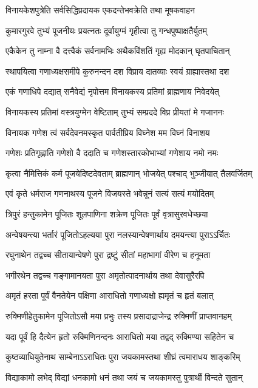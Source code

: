\begin{center}
\twolineshloka
{विनायकेशपुत्रेति सर्वसिद्धिप्रदायक}
{एकदन्तेभवक्रेति तथा मूषकवाहन}%

\twolineshloka
{कुमारगुरवे तुभ्यं पूजनीयः प्रयत्नतः}
{दूर्वायुग्मं गृहीत्वा तु गन्धपुष्पाक्षतैर्युतम्}%

\twolineshloka
{एकैकेन तु नाम्ना वै दत्त्वैकं सर्वनामभिः}
{अथैकविंशतिं गृह्य मोदकान् घृतपाचितान्}%

\twolineshloka
{स्थापयित्वा गणाध्यक्षसमीपे कुरुनन्दन}
{दश विप्राय दातव्याः स्वयं ग्राह्यास्तथा दश}%

\twolineshloka
{एकं गणाधिपे दद्यात् सनैवेद्यं नृपोत्तम}
{विनायकस्य प्रतिमां ब्राह्मणाय निवेदयेत्}%

\twolineshloka
{विनायकस्य प्रतिमां वस्त्रयुग्मेन वेष्टिताम्}
{तुभ्यं सम्प्रददे विप्र प्रीयतां मे गजाननः}%

\twolineshloka
{विनायक गणेश त्वं सर्वदेवनमस्कृत}
{पार्वतीप्रिय विघ्नेश मम विघ्नं विनाशय}%

\twolineshloka
{गणेशः प्रतिगृह्णाति गणेशो वै ददाति च}
{गणेशस्तारकोभाभ्यां गणेशाय नमो नमः}%

\twolineshloka
{कृत्वा नैमित्तिकं कर्म पूजयेदिष्टदेवताम्}
{ब्राह्मणान् भोजयेत् पश्चाद् भुञ्जीयात् तैलवर्जितम्}%

\twolineshloka
{एवं कृते धर्मराज गणनाथस्य पूजने}
{विजयस्ते भवेन्नूनं सत्यं सत्यं मयोदितम्}%

\twolineshloka
{त्रिपुरं हन्तुकामेन पूजितः शूलपाणिना}
{शक्रेण पूजितः पूर्वं वृत्रासुरवधेच्छया}%

\twolineshloka
{अन्वेषयन्त्या भर्तारं पूजितोऽहल्यया पुरा}
{नलस्यान्वेषणार्थाय दमयन्त्या पुराऽऽर्चितः}%

\twolineshloka
{रघुनाथेन तद्वच्च सीतायान्वेषणे पुरा}
{द्रष्टुं सीतां महाभागां वीरेण च हनूमता}%

\twolineshloka
{भगीरथेन तद्वच्च गङ्गामानयता पुरा}
{अमृतोत्पादनार्थाय तथा देवासुरैरपि}%

\twolineshloka
{अमृतं हरता पूर्वं वैनतेयेन पक्षिणा}
{आराधितो गणाध्यक्षो ह्यमृतं च हृतं बलात्}%

\twolineshloka
{रुक्मिणीहेतुकामेन पूजितोऽसौ मया प्रभुः}
{तस्य प्रसादाद्राजेन्द्र रुक्मिणीं प्राप्तवानहम्}%

\twolineshloka
{यदा पूर्वं हि दैत्येन हृतो रुक्मिणिनन्दनः}
{आराधितो मया तद्वद् रुक्मिण्या सहितेन च}%

\twolineshloka
{कुष्ठव्याधियुतेनाथ साम्बेनाऽऽराधितः पुरा}
{जयकामस्तथा शीघ्रं त्वमाराधय शाङ्करिम्}%

\twolineshloka
{विद्याकामो लभेद् विद्यां धनकामो धनं तथा}
{जयं च जयकामस्तु पुत्रार्थी विन्दते सुतान्}%


\end{center}
